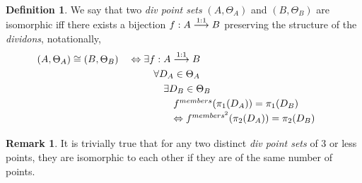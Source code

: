 \documentclass[11pt, oneside]{article}      %
\theoremstyle{definition}
\newtheorem{defn}{Definition}
\numberwithin{equation}{section}
\newtheorem*{remark}{Remark}
\theoremstyle{c}
\begin{document}
\begin{defn} We say that two \textit{div point sets} $(A,\Theta_A)$ and $(B, \Theta_B)$ are isomorphic iff there exists a bijection $f:A \stackrel{\rm{1:1}}{\longrightarrow} B$ preserving the structure of the \textit{dividons}, notationally,
\begin{alignat}{2}\label{isomorphism}
  &(A,\Theta_A) \cong (B,\Theta_B)  && \Leftrightarrow \begin{aligned}[t] \renewcommand\arraystretch{1.25}\begin{array}[t]{@{\hskip0em}l}
  \exists f:A \stackrel{\rm{1:1}}{\longrightarrow} B\\
 \quad\forall D_A \in \Theta_A \\
 \quad\quad\exists D_B \in \Theta_B \\
 \quad\quad\quad f^{members}(\pi_1(D_A)) = \pi_1(D_B)\\
 \quad\quad\quad \Leftrightarrow f^{members^{2}}(\pi_2(D_A)) = \pi_2(D_B) \\
  \end{array}
  \end{aligned}
\end{alignat}
\end{defn}

\begin{remark}It is trivially true that for any two distinct \textit{div point sets} of 3 or less points, they are isomorphic to each other if they are of the same number of points. \end{remark}
\end{document}
